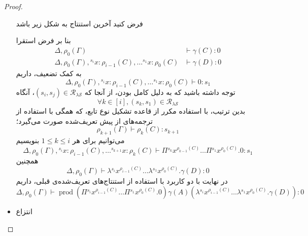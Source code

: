 \begin{proof}
\begin{itemize}
فرض کنید آخرین استنتاج به شکل زیر باشد
\begin{prooftree}
\end{prooftree}
بنا بر فرض استقرا
\begin{align*}
\Delta, \rho_0(\Gamma) &\vdash \gamma(C) : 0 \\
\Delta, \rho_0(\Gamma), {}^{s_i}x : \rho_{i-1}(C), \dots {}^{s_1}x : \rho_0(C) &\vdash \gamma(D) : 0
\end{align*}
به کمک تضعیف، داریم
\begin{equation*}
\Delta, \rho_0(\Gamma), {}^{s_i}x : \rho_{i-1}(C), \dots {}^{s_1}x : \rho_0(C) \vdash 0 : s_1
\end{equation*}
توجه داشته باشید که به دلیل کامل بودن، از آنجا که
$(s_i,s_j) \in \mathcal{R_{\lambda S}}$،
آنگاه
\begin{equation*}
\forall k \in [i], (s_k,s_1) \in \mathcal{R_{\lambda S}}
\end{equation*}
بدین ترتیب، با استفاده مکرر از قاعده تشکیل نوع تابع، که همگی با استفاده از ترجمه‌های از پیش تعریف‌شده صورت می‌گیرد؛
\begin{equation*}
\rho_{k+1}(\Gamma) \vdash \rho_k(C) : s_{k+1}
\end{equation*}
می‌توانیم برای هر
$1 \le k \le i$
بنویسیم
\begin{equation*}
\Delta, \rho_0(\Gamma), {}^{s_i}x : \rho_{i-1}(C), \dots {}^{s_{k+1}}x : \rho_k(C) \vdash \Pi {}^{s_k}x^{\rho_{k-1}(C)} \dots \Pi {}^{s_1}x^{\rho_{0}(C)}.0 : s_1
\end{equation*}
همچنین
\begin{equation*}
\Delta, \rho_0(\Gamma) \vdash \lambda {}^{s_i}x^{\rho_{i-1}(C)} \dots \lambda {}^{s_1}x^{\rho_{0}(C)}.\gamma(D) : 0
\end{equation*}
در نهایت با دو کاربرد با استفاده از استنتاج‌های تعریف‌شده‌ی قبلی، داریم
\begin{equation*}
\Delta, \rho_0(\Gamma) \vdash \operatorname{prod}(\Pi {}^{s_i}x^{\rho_{i-1}(C)} \dots \Pi {}^{s_1}x^{\rho_{0}(C)}.0) \gamma(A) (\lambda {}^{s_i}x^{\rho_{i-1}(C)} \dots \lambda {}^{s_1}x^{\rho_{0}(C)}.\gamma(D)) : 0
\end{equation*}

\item انتزاع


\end{itemize}
\end{proof}
